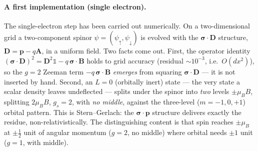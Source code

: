 \documentclass[11pt]{article}
\begin{document}
\paragraph{A first implementation (single electron).} The single-electron step has been carried out
numerically. On a two-dimensional grid a two-component spinor $\psi=(\psi_\uparrow,\psi_\downarrow)$ is
evolved with the $\boldsymbol\sigma\cdot\mathbf D$ structure, $\mathbf D = \mathbf p-q\mathbf A$, in a
uniform field. Two facts come out. First, the operator identity
$(\boldsymbol\sigma\cdot\mathbf D)^2 = \mathbf D^2\mathbb 1 - q\,\boldsymbol\sigma\cdot\mathbf B$ holds to
grid accuracy (residual $\sim 10^{-3}$, i.e.\ $O(dx^2)$), so the $g=2$ Zeeman term $-q\,\boldsymbol\sigma
\cdot\mathbf B$ \emph{emerges} from squaring $\boldsymbol\sigma\cdot\mathbf D$ --- it is not inserted by
hand. Second, an $L=0$ (orbitally inert) state --- the very state a scalar density leaves undeflected ---
splits under the spinor into \emph{two} levels $\pm\mu_B B$, splitting $2\mu_B B$, $g_s=2$, with
\emph{no middle}, against the three-level ($m=-1,0,+1$) orbital pattern. This is Stern--Gerlach: the
$\boldsymbol\sigma\cdot\mathbf p$ structure delivers exactly the residue, non-relativistically. The
distinguishing content is that spin reaches $\pm\mu_B$ at $\pm\tfrac12$ unit of angular momentum ($g=2$,
no middle) where orbital needs $\pm1$ unit ($g=1$, with middle).
\end{document}
